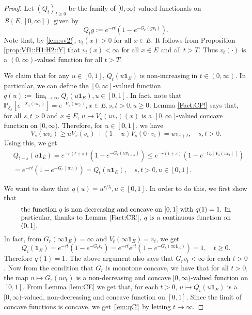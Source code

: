 \documentclass[12pt,a4paper]{amsart}
\numberwithin{equation}{section}
\theoremstyle{plain}
\theoremstyle{definition}
\theoremstyle{remark}
\begin{document}
\begin{proof}
	Let $(Q_t)_{t\geq 0}$ be the family of $[0,\infty)$-valued functionals on $\mathcal B(E,[0,\infty])$ given by
\[
	Q_tg
	:= e^{- r t}( 1 - e^{-G_r(gv_t)} ).
\]
	Note that, by \eqref{lem:sv2!}, $v_t(x)>0$ for all $x\in E$.
	It follows  from Proposition \ref{prop:Vf1::H1:H2::Y} that $v_t(x)<\infty$ for all $x\in E$ and all $t> T$.
	Thus $v_t(\cdot)$ is a $(0,\infty)$-valued function for all $t> T$.

	We claim that for any $u \in [0,1]$,
	$Q_t(u \mathbf 1_E)$ is non-increasing in $t\in (0,\infty)$.
	In particular, we can define the $[0,\infty]$-valued function
	$q(u):= \lim_{t\to \infty} Q_t(u \mathbf 1_E), u\in [0,1]$.
	In fact, note that $\mathbb P_{\delta_x}[e^{- X_s(uv_t)}] = e^{-V_s(uv_t)},x\in E, s,t>0, u \geq 0$.
	Lemma \ref{Fact:CP!} says that, for all $s,t > 0$ and $x\in E$, $u\mapsto V_s(uv_t)(x) $ is a $[0,\infty]$-valued concave function on $[0,\infty)$.
	Therefore, for $u\in [0,1]$, we have
\begin{equation}
	V_s(uv_t)
	\geq uV_s(v_t) + (1-u) V_s(0\cdot v_t)
	= uv_{s+t},
	\quad s,t > 0.
\end{equation}
	Using this, we get
\begin{align}
	& Q_{t+s}(u \mathbf 1_E)
	= e^{- r (t+s)} ( 1-e^{-G_r(uv_{t+s})} )
	\leq e^{- r(t+s)}( 1-e^{-G_r[V_s(uv_t)]} ) \\
	& = e^{-r t}( 1-e^{-G_r(uv_t)} )
	= Q_t(u \mathbf 1_E),
	\quad s,t > 0, u \in [0,1].
\end{align}

	We want to show that $q(u)= u^{r/\lambda}, u\in [0,1]$.
	In order to do this, we first show that
\begin{equation} \label{lem:qC!}
\begin{minipage}{0.9\textwidth}
	the function $q$ is non-decreasing and concave on $[0,1]$ with $q(1) = 1$.
	In particular, thanks to Lemma \ref{Fact:CR!}, $q$ is a continuous function on $(0,1]$.
\end{minipage}
\end{equation}
	In fact, from $G_r(\infty \mathbf 1_E) = \infty$ and $V_t(\infty \mathbf 1_E) = v_t$, we get
	\[
	Q_t( \mathbf 1_E)
	= e^{- r t} ( 1-e^{-G_r v_t} )
	= e^{- r t} e^{r t}( 1-e^{-G_r (\infty \mathbf 1_E)} )
	= 1,
	\quad t\geq 0.
	\]
	Therefore $q(1) = 1$.
	The above argument also says that $G_r v_t < \infty$ for each $t>0$.
	Now from the condition that $G_r$ is monotone concave, we have that for all $t>0$, the map $u \mapsto G_r(uv_t)$ is a non-decreasing and concave $[0,\infty)$-valued function on $[0,1]$.
	From Lemma \ref{lem:CE} we get that, for each $t> 0$, $u \mapsto Q_t(u \mathbf 1_E)$ is a $[0,\infty)$-valued, non-decreasing and concave function on $[0,1]$.
	Since the limit of concave functions is concave, we get \eqref{lem:qC!} by letting $t\to \infty$.


\end{proof}
\end{document}
